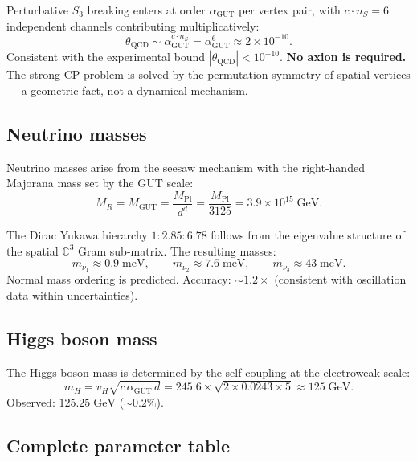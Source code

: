 Perturbative $S_3$ breaking enters at order $\alpha_\text{GUT}$ per vertex pair, with $c \cdot n_S = 6$ independent channels contributing multiplicatively:
\begin{equation}
\theta_\text{QCD} \sim \alpha_\text{GUT}^{c \cdot n_S} = \alpha_\text{GUT}^6 \approx 2 \times 10^{-10}.
\end{equation}
Consistent with the experimental bound $|\theta_\text{QCD}| < 10^{-10}$. \textbf{No axion is required.} The strong CP problem is solved by the permutation symmetry of spatial vertices --- a geometric fact, not a dynamical mechanism.

\subsection{Neutrino masses}

Neutrino masses arise from the seesaw mechanism with the right-handed Majorana mass set by the GUT scale:
\begin{equation}
M_R = M_\text{GUT} = \frac{M_\text{Pl}}{d^d} = \frac{M_\text{Pl}}{3125} = 3.9 \times 10^{15}\;\text{GeV}.
\end{equation}

The Dirac Yukawa hierarchy $1 : 2.85 : 6.78$ follows from the eigenvalue structure of the spatial $\mathbb{C}^3$ Gram sub-matrix. The resulting masses:
\begin{equation}
m_{\nu_1} \approx 0.9\;\text{meV}, \qquad m_{\nu_2} \approx 7.6\;\text{meV}, \qquad m_{\nu_3} \approx 43\;\text{meV}.
\end{equation}
Normal mass ordering is predicted. Accuracy: $\sim 1.2\times$ (consistent with oscillation data within uncertainties).

\subsection{Higgs boson mass}

The Higgs boson mass is determined by the self-coupling at the electroweak scale:
\begin{equation}
m_H = v_H\sqrt{c\,\alpha_\text{GUT}\,d} = 245.6 \times \sqrt{2 \times 0.0243 \times 5} \approx 125\;\text{GeV}.
\end{equation}
Observed: $125.25\;\text{GeV}$ ($\sim 0.2\%$).

\subsection{Complete parameter table}

